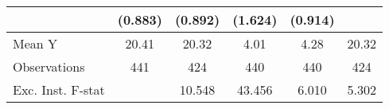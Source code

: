 {\begin{tabular}{l*{5}{c}}
            &     (0.883)         &     (0.892)         &     (1.624)         &     (0.914)         &                     \\
\midrule
Mean Y      &       20.41         &       20.32         &        4.01         &        4.28         &       20.32         \\
Observations&         441         &         424         &         440         &         440         &         424         \\
Exc. Inst. F-stat&                     &      10.548         &      43.456         &       6.010         &       5.302         \\
\bottomrule
\end{tabular}
}
